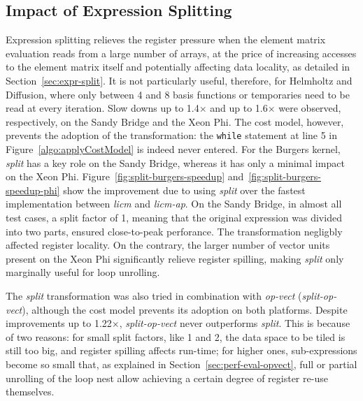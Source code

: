 \documentclass[conference]{IEEEtran}
\begin{document}
\subsection{Impact of Expression Splitting}
\label{sec:perf-results-split}
Expression splitting relieves the register pressure when the element matrix evaluation reads from a large number of arrays, at the price of increasing accesses to the element matrix itself and potentially affecting data locality, as detailed in Section~\ref{sec:expr-split}. It is not particularly useful, therefore, for Helmholtz and Diffusion, where only between 4 and 8 basis functions or temporaries need to be read at every iteration. Slow downs up to 1.4$\times$ and up to 1.6$\times$ were observed, respectively, on the Sandy Bridge and the Xeon Phi. The cost model, however, prevents the adoption of the transformation: the \texttt{while} statement at line 5 in Figure~\ref{algo:applyCostModel} is indeed never entered. For the Burgers kernel, \emph{split} has a key role on the Sandy Bridge, whereas it has only a minimal impact on the Xeon Phi. Figure~\ref{fig:split-burgers-speedup} and~\ref{fig:split-burgers-speedup-phi} show the improvement due to using \emph{split} over the fastest implementation between \emph{licm} and \emph{licm-ap}. On the Sandy Bridge, in almost all test cases, a split factor of 1, meaning that the original expression was divided into two parts, ensured close-to-peak perforance. The transformation negligbly affected register locality. On the contrary, the larger number of vector units present on the Xeon Phi significantly relieve register spilling, making \emph{split} only marginally useful for loop unrolling. 

The \emph{split} transformation was also tried in combination with \emph{op-vect} (\emph{split-op-vect}), although the cost model prevents its adoption on both platforms. Despite improvements up to 1.22$\times$, \emph{split-op-vect} never outperforms \emph{split}. This is because of two reasons: for small split factors, like 1 and 2, the data space to be tiled is still too big, and register spilling affects run-time; for higher ones, sub-expressions become so small that, as explained in Section~\ref{sec:perf-eval-opvect}, full or partial unrolling of the loop nest allow achieving a certain degree of register re-use themselves.
\end{document}
